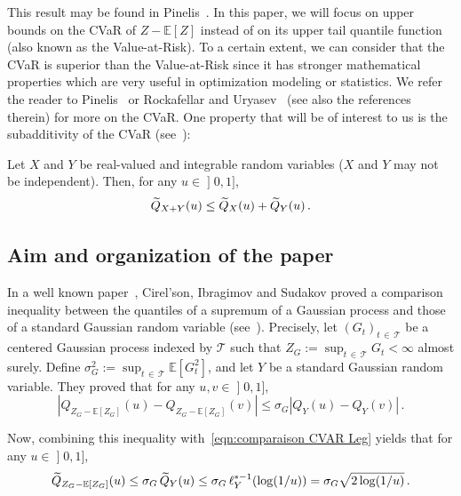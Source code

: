 \documentclass[10pt]{amsart}
\theoremstyle{definition}\newtheorem{defi}[theo]{Definition}\newtheorem{rema}[theo]{Remark}\newtheorem{exam}[theo]{Example}\newtheorem{exem}[theo]{Example}\newtheorem{nota}[theo]{Notation}
\newcommand{\bE}{\mathbb{E}}
\newcommand{\cT}{\mathcal{T}}
\newcommand{\intervalleof}[2]{\mathopen{]} #1\mathclose{}\mathpunct{},#2\mathclose{]}}
\let\oldtilde\tilde
\renewcommand*{\tilde}[1]{\mathchoice{\widetilde{#1}}{\widetilde{#1}}{\oldtilde{#1}}{\oldtilde{#1}}}
\begin{document}
This result may be found in Pinelis~\cite[Theorem~3.4]{Pinelis14b}. In this paper, we will focus on upper bounds on the CVaR of $Z-\bE[Z]$ instead of on its upper tail quantile function (also known as the Value-at-Risk). To a certain extent, we can consider that the CVaR is superior than the Value-at-Risk since it has stronger mathematical properties which are very useful in optimization modeling or statistics. We refer the reader to Pinelis~\cite{Pinelis14b} or Rockafellar and Uryasev~\cite{RU00} (see also the references therein) for more on the CVaR. One property that will be of interest to us is the subadditivity of the CVaR (see~\cite[Theorem~3.4]{Pinelis14b}):

\begin{prop}\label{prop:subadd CVaR}
Let $X$ and $Y$ be real-valued and integrable random variables ($X$ and $Y$ may not be independent). Then, for any $u\in\intervalleof 01$,
\begin{equation*}
\tilde{Q}_{X+Y}(u)\leq \tilde{Q}_X(u)+\tilde{Q}_Y(u)\,.
\end{equation*}
\end{prop}



\subsection{Aim and organization of the paper}

In a well known paper~\cite{CIS76}, Cirel'son, Ibragimov and Sudakov proved a comparison inequality between the quantiles of a supremum of a Gaussian process and those of a standard Gaussian random variable (see~\cite[pages~22-23]{CIS76}). Precisely, let $(G_t)_{t\,\in\,\cT}$ be a centered Gaussian process indexed by $\cT$ such that $Z_G:=\sup_{t\,\in\,\cT}G_t<\infty$ almost surely. Define $\sigma_G^2:=\sup_{t\,\in\,\cT}\bE[G_t^2]$, and let $Y$ be a standard Gaussian random variable. They proved that for any $u,v\in\intervalleof 01$,
\begin{equation}\label{eqn:CIS}
\left|Q_{Z_G-\bE[Z_G]}(u)-Q_{Z_G-\bE[Z_G]}(v)\right|\leq\sigma_G \left|Q_{Y}(u)-Q_Y(v)\right|\,.
\end{equation}


Now, combining this inequality with~\eqref{eqn:comparaison CVAR Leg} yields that for any $u\in\intervalleof 01$,
\begin{equation}\label{eqn:CIS2}
\tilde Q_{Z_G-\bE[Z_G]}(u)\leq \sigma_G\,\tilde Q_Y(u)\leq\sigma_G\,\ell_Y^{*-1}(\log(1/u))=\sigma_G\sqrt{2\log(1/u)}\,.
\end{equation}
\end{document}
